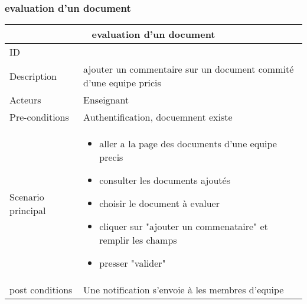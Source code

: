 \documentclass[11pt,fleqn]{book} %
\begin{document}
\subsubsection{evaluation d'un document}
\begin{center}
\begin{tabularx}{1\textwidth} { | p{4cm} | >{\raggedright\arraybackslash}X |  }
  \hline
  \multicolumn{2}{|c|}{evaluation  d'un document} \\
 \hline
 ID & 4  \\
 \hline
 Description  &  ajouter un commentaire sur un document commité d'une equipe pricis  \\
  \hline
 Acteurs  & Enseignant  \\
  \hline
 Pre-conditions  & Authentification, docuemnent existe\\
 \hline
 Scenario principal  &  
 \begin{itemize}
     \item aller a la page des documents d'une equipe precis
     \item consulter les documents ajoutés 
      \item choisir le document à evaluer
      \item cliquer sur "ajouter un commenataire" et remplir les champs
      \item presser "valider"

 \end{itemize}\\
  \hline
 post conditions  &  Une notification s’envoie à les membres d'equipe  \\
  \hline
\end{tabularx}
\label{tbl:nicetablelesstable}
\end{center}
\end{document}
